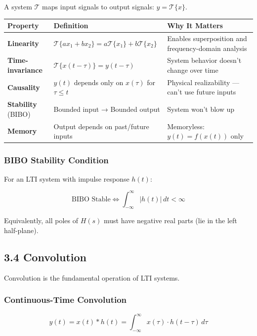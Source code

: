 \documentclass[11pt,a4paper]{book}
\begin{document}
A system $\mathcal{T}$ maps input signals to output signals: $y = \mathcal{T}\{x\}$.

\begin{center}
\begin{tabular}{|l|l|l|}
\hline
Property & Definition & Why It Matters \\
\hline
\textbf{Linearity} & $\mathcal{T}\{ax_1 + bx_2\} = a\mathcal{T}\{x_1\} + b\mathcal{T}\{x_2\}$ & Enables superposition and frequency-domain analysis \\
\textbf{Time-invariance} & $\mathcal{T}\{x(t-\tau)\} = y(t-\tau)$ & System behavior doesn't change over time \\
\textbf{Causality} & $y(t)$ depends only on $x(\tau)$ for $\tau \leq t$ & Physical realizability — can't use future inputs \\
\textbf{Stability} (BIBO) & Bounded input → Bounded output & System won't blow up \\
\textbf{Memory} & Output depends on past/future inputs & Memoryless: $y(t) = f(x(t))$ only \\
\hline
\end{tabular}
\end{center}

\subsubsection{BIBO Stability Condition}

For an LTI system with impulse response $h(t)$:

\[\text{BIBO Stable} \iff \int_{-\infty}^{\infty} |h(t)| \, dt < \infty\]

Equivalently, all poles of $H(s)$ must have negative real parts (lie in the left half-plane).

\medskip\noindent\hrulefill\medskip

\subsection{3.4 Convolution}

Convolution is the fundamental operation of LTI systems.

\subsubsection{Continuous-Time Convolution}

\[y(t) = x(t) * h(t) = \int_{-\infty}^{\infty} x(\tau) \cdot h(t - \tau) \, d\tau\]
\end{document}

